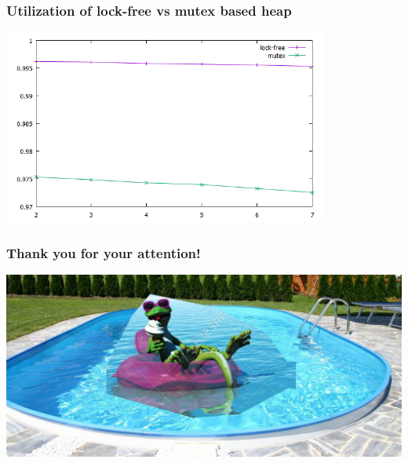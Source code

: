 \documentclass{beamer}
\begin{document}
\begin{frame}
	\frametitle{Utilization of lock-free vs mutex based heap}
	\begin{center}
		\includegraphics[width=0.8\textwidth]{img/lock_free.png}
	\end{center}

\end{frame}



\begin{frame}
    \frametitle{Thank you for your attention!}
 	\includegraphics[width=\textwidth]{img/important.jpg}
\end{frame}
\end{document}
